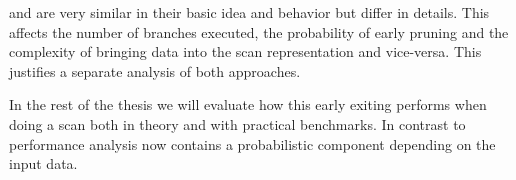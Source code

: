\bwv{} and \bs{} are very similar in their basic idea and behavior but differ in
details. This affects the number of branches executed, the probability of early
pruning and the complexity of bringing data into the scan representation and
vice-versa. This justifies a separate analysis of both approaches.

In the rest of the thesis we will evaluate how this early exiting performs when
doing a scan both in theory and with practical benchmarks. In contrast to
\simdscan{} performance analysis now contains a probabilistic component
depending on the input data.
